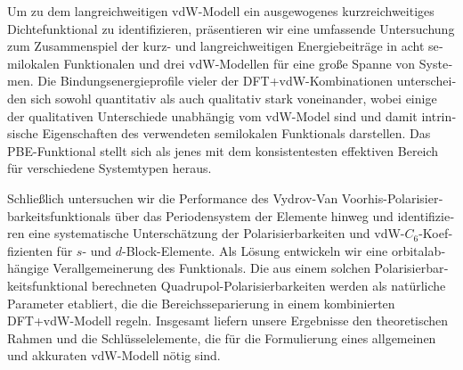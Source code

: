 \begin{otherlanguage}{german}
Um zu dem langreichweitigen vdW-Modell ein ausgewogenes kurzreichweitiges Dichtefunktional zu identifizieren, präsentieren wir eine umfassende Untersuchung zum Zusammenspiel der kurz- und langreichweitigen Energiebeiträge in acht semilokalen Funktionalen und drei vdW-Modellen für eine große Spanne von Systemen.
Die Bindungsenergieprofile vieler der DFT+vdW-Kombinationen unterscheiden sich sowohl quantitativ als auch qualitativ stark voneinander, wobei einige der qualitativen Unterschiede unabhängig vom vdW-Model sind und damit intrinsische Eigenschaften des verwendeten semilokalen Funktionals darstellen.
Das PBE-Funktional stellt sich als jenes mit dem konsistentesten effektiven Bereich für verschiedene Systemtypen heraus.

Schließlich untersuchen wir die Performance des Vydrov-Van Voorhis-Polarisierbar\-keits\-funktionals über das Periodensystem der Elemente hinweg und identifizieren eine systematische Unterschätzung der Polarisierbarkeiten und vdW-$C_6$-Koeffizienten für $s$- und $d$-Block-Elemente.
Als Lösung entwickeln wir eine orbitalabhängige Verallgemeinerung des Funktionals.
Die aus einem solchen Polarisierbarkeitsfunktional berechneten Quadrupol-Polarisierbarkeiten werden als natürliche Parameter etabliert, die die Bereichsseparierung in einem kombinierten DFT+vdW-Modell regeln.
Insgesamt liefern unsere Ergebnisse den theoretischen Rahmen und die Schlüsselelemente, die für die Formulierung eines allgemeinen und akkuraten vdW-Modell nötig sind.
\end{otherlanguage}
